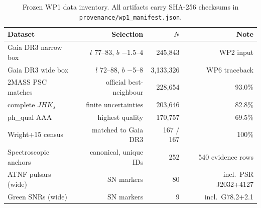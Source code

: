 \begin{table}
\caption{Frozen WP1 data inventory. All artifacts carry SHA-256 checksums in \texttt{provenance/wp1\_manifest.json}.}
\label{tab:wp1}
\centering
\begin{tabular}{lrrr}
\hline\hline
Dataset & Selection & $N$ & Note \\
\hline
Gaia DR3 narrow box & $l$ 77--83, $b$ $-$1.5--4 & 245,843 & WP2 input \\
Gaia DR3 wide box & $l$ 72--88, $b$ $-$5--8 & 3,133,326 & WP6 traceback \\
2MASS PSC matches & official best-neighbour & 228,654 & 93.0\% \\
\quad complete $JHK_s$ & finite uncertainties & 203,646 & 82.8\% \\
\quad ph\_qual AAA & highest quality & 170,757 & 69.5\% \\
Wright+15 census & matched to Gaia DR3 & 167 / 167 & 100\% \\
Spectroscopic anchors & canonical, unique IDs & 252 & 540 evidence rows \\
ATNF pulsars (wide) & SN markers & 80 & incl.\ PSR J2032+4127 \\
Green SNRs (wide) & SN markers & 9 & incl.\ G78.2+2.1 \\
\hline
\end{tabular}
\end{table}
